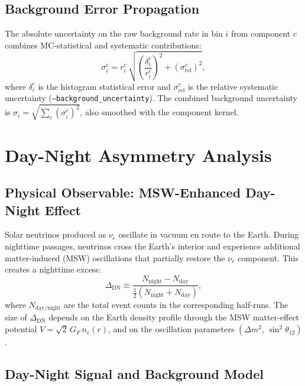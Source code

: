 \documentclass[12pt,a4paper]{article}
\newcommand{\srel}{\sigma_{\mathrm{rel}}}
\begin{document}
\subsection{Background Error Propagation}
\label{sec:bkg_error}

The absolute uncertainty on the raw background rate in bin $i$ from component $c$
combines MC-statistical and systematic contributions:
\begin{equation}
  \sigma_{i}^{c} = r_i^{c}\,
    \sqrt{\left(\frac{\delta_i^c}{r_i^c}\right)^{\!2}
          + \left(\srel^c\right)^2},
  \label{eq:bin_error}
\end{equation}
where $\delta_i^c$ is the histogram statistical error and $\srel^c$ is
the relative systematic uncertainty (\texttt{--background\_uncertainty}).
The combined background uncertainty is $\sigma_i = \sqrt{\sum_c (\sigma_i^c)^2}$,
also smoothed with the component kernel.

\section{Day-Night Asymmetry Analysis}
\label{sec:daynight}

\subsection{Physical Observable: MSW-Enhanced Day-Night Effect}
\label{sec:dn_physics}

Solar neutrinos produced as $\nu_e$ oscillate in vacuum en route to the Earth.
During nighttime passages, neutrinos cross the Earth's interior and experience
additional matter-induced (MSW) oscillations that partially restore the
$\nu_e$ component.  This creates a nighttime excess:
\begin{equation}
  \Delta_{\mathrm{DN}} \equiv \frac{N_{\mathrm{night}} - N_{\mathrm{day}}}
    {{\tfrac{1}{2}(N_{\mathrm{night}} + N_{\mathrm{day}})}},
  \label{eq:dn_asymmetry}
\end{equation}
where $N_{\mathrm{day/night}}$ are the total event counts in the
corresponding half-runs.  The size of $\Delta_{\mathrm{DN}}$ depends
on the Earth density profile through the MSW matter-effect potential
$V = \sqrt{2}\,G_F\, n_e(r)$, and on the oscillation parameters
$(\Delta m^2,\,\sin^2\theta_{12})$.

\subsection{Day-Night Signal and Background Model}
\label{sec:dn_model}
\end{document}
